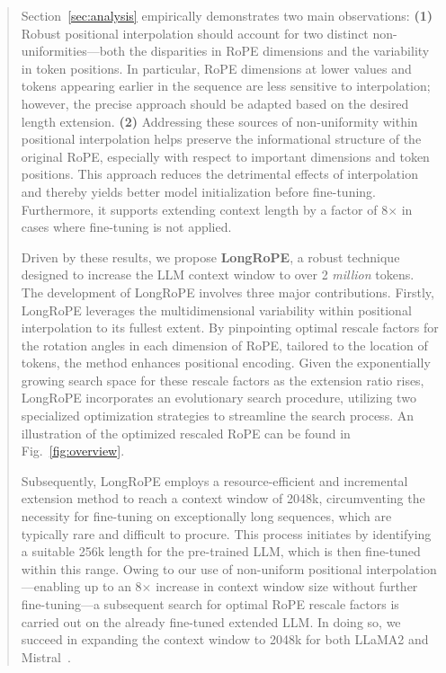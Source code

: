 \begin{abstract}
Section~\ref{sec:analysis} empirically demonstrates two main observations: \textbf{(1)} Robust positional interpolation should account for two distinct non-uniformities—both the disparities in RoPE dimensions and the variability in token positions. In particular, RoPE dimensions at lower values and tokens appearing earlier in the sequence are less sensitive to interpolation; however, the precise approach should be adapted based on the desired length extension. \textbf{(2)} Addressing these sources of non-uniformity within positional interpolation helps preserve the informational structure of the original RoPE, especially with respect to important dimensions and token positions. This approach reduces the detrimental effects of interpolation and thereby yields better model initialization before fine-tuning. Furthermore, it supports extending context length by a factor of 8$\times$ in cases where fine-tuning is not applied.

Driven by these results, we propose \textbf{LongRoPE}, a robust technique designed to increase the LLM context window to over 2 \emph{million} tokens. The development of LongRoPE involves three major contributions. Firstly, LongRoPE leverages the multidimensional variability within positional interpolation to its fullest extent. By pinpointing optimal rescale factors for the rotation angles in each dimension of RoPE, tailored to the location of tokens, the method enhances positional encoding. Given the exponentially growing search space for these rescale factors as the extension ratio rises, LongRoPE incorporates an evolutionary search procedure, utilizing two specialized optimization strategies to streamline the search process. An illustration of the optimized rescaled RoPE can be found in Fig.~\ref{fig:overview}.

Subsequently, {LongRoPE} employs a resource-efficient and incremental extension method to reach a context window of 2048k, circumventing the necessity for fine-tuning on exceptionally long sequences, which are typically rare and difficult to procure. This process initiates by identifying a suitable 256k length for the pre-trained LLM, which is then fine-tuned within this range. Owing to our use of non-uniform positional interpolation—enabling up to an 8$\times$ increase in context window size without further fine-tuning—a subsequent search for optimal RoPE rescale factors is carried out on the already fine-tuned extended LLM. In doing so, we succeed in expanding the context window to 2048k for both LLaMA2 and Mistral~\cite{mistral}.


\end{abstract}
